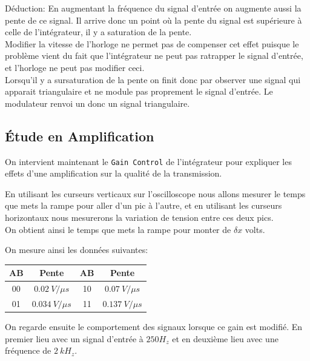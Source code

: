 \documentclass[11pt, openright]{book}
\begin{document}
\begin{dent}{Déduction:} En augmentant la fréquence du signal d'entrée on augmente aussi la pente de ce signal. Il arrive donc un point où la pente du signal est supérieure à celle de l'intégrateur, il y a saturation de la pente.\\

    Modifier la vitesse de l'horloge ne permet pas de compenser cet effet puisque le problème vient du fait que l'intégrateur ne peut pas ratrapper le signal d'entrée, et l'horloge ne peut pas modifier ceci.\\

    Lorsqu'il y a sursaturation de la pente on finit donc par observer une signal qui apparait triangulaire et ne module pas proprement le signal d'entrée. Le modulateur renvoi un donc un signal triangulaire.
\end{dent}



\subsection{Étude en Amplification}

On intervient maintenant le \texttt{Gain Control} de l'intégrateur pour expliquer les effets d'une amplification sur la qualité de la transmission.

En utilisant les curseurs verticaux sur l'oscilloscope nous allons mesurer le temps que mets la rampe pour aller d'un pic à l'autre, et en utilisant les curseurs horizontaux nous mesurerons la variation de tension entre ces deux pics. \\
On obtient ainsi le temps que mets la rampe pour monter de $\delta x$ volts.

On mesure ainsi les données suivantes:

\begin{center}
    \begin{tabular}{c|c|c|c}
        AB & Pente            & AB & Pente            \\
        \hline
        00 & $0.02\ V/\mu s$  & 10 & $0.07\ V/\mu s$  \\
        \hline
        01 & $0.034\ V/\mu s$ & 11 & $0.137\ V/\mu s$
    \end{tabular}
\end{center}

On regarde ensuite le comportement des signaux lorsque ce gain est modifié. En premier lieu avec un signal d'entrée à $250H_z$ et en deuxième lieu avec une fréquence de $2\ kH_z$.
\end{document}
